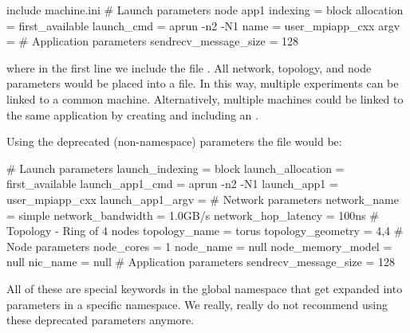 \begin{ViFile}
include machine.ini
# Launch parameters
node {
 app1 {
  indexing = block
  allocation = first_available
  launch_cmd = aprun -n2 -N1
  name = user_mpiapp_cxx
  argv = 
  # Application parameters
  sendrecv_message_size = 128
 }
}

\end{ViFile}
where in the first line we include the file .  
All network, topology, and node parameters would be placed into a  file.  
In this way, multiple experiments can be linked to a common machine.  
Alternatively, multiple machines could be linked to the same application by creating and including an .

Using the deprecated (non-namespace) parameters the file would be:

\begin{ViFile}
# Launch parameters
launch_indexing = block
launch_allocation = first_available
launch_app1_cmd = aprun -n2 -N1
launch_app1 = user_mpiapp_cxx
launch_app1_argv = 
# Network parameters
network_name = simple
network_bandwidth = 1.0GB/s
network_hop_latency = 100ns
# Topology - Ring of 4 nodes
topology_name = torus
topology_geometry = 4,4
# Node parameters
node_cores = 1
node_name = null
node_memory_model = null
nic_name = null
# Application parameters
sendrecv_message_size = 128
\end{ViFile}

All of these are special keywords in the global namespace that get expanded into parameters in a specific namespace. We really, really do not recommend using these deprecated parameters anymore.

